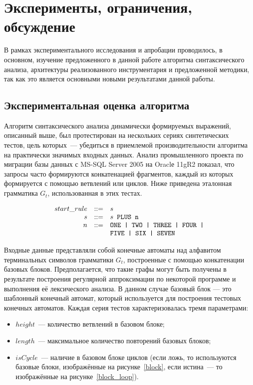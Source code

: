\chapter{Эксперименты, ограничения, обсуждение} \label{chaptEval}

В рамках экспериментального исследования и апробации проводилось, в основном, изучение предложенного в данной работе алгоритма синтаксического анализа, архитектуры реализованного инструментария и предложенной методики, так как это является основными новыми результатами данной работы.


\section{Экспериментальная оценка алгоритма}\label{SyntTestsEvalDescr}

Алгоритм синтаксического анализа динамически формируемых выражений, описанный выше, был протестирован на нескольких сериях синтетических тестов, цель которых~--- убедиться в приемлемой производительности алгоритма на практически значимых входных данных. Анализ промышленного проекта по миграции базы данных с MS-SQL Server 2005 на Oraclе 11gR2 показал, что запросы часто формируются конкатенацией фрагментов, каждый из которых формируется с помощью ветвлений или циклов. Ниже приведена эталонная грамматика $G_t$, использованная в этих тестах.

$$
\begin{array}{crcl}
& start\_rule &::=& s \\
& s & ::= & s \mbox{\texttt{ PLUS }} \mbox{\texttt{n}}\\
& n & ::= & \mbox{\texttt{ONE | }} \mbox{\texttt{TWO | }} \mbox{\texttt{THREE | }} \mbox{\texttt{FOUR | }} \\
&   &     & \mbox{\texttt{FIVE | }} \mbox{\texttt{SIX | }} \mbox{\texttt{SEVEN}}
\end{array}
$$

Входные данные представляли собой конечные автоматы над алфавитом терминальных символов грамматики $G_t$, построенные с помощью конкатенации базовых блоков. Предполагается, что такие графы могут быть получены в результате построения регулярной аппроксимации по некоторой программе и выполнения её лексического анализа. В данном случае базовый блок --- это шаблонный конечный автомат, который используется для построения тестовых конечных автоматов. Каждая серия тестов характеризовалась тремя параметрами: 

\begin{itemize}
  \item $height$~--- количество ветвлений в базовом блоке;
  \item $length$~--- максимальное количество повторений базовых блоков;
  \item $isCycle$~--- наличие в базовом блоке циклов (если ложь, то используются базовые блоки, изображённые на рисунке~\ref{block}, если истина~--- то изображённые на рисунке~\ref{block_loop}).
\end{itemize}

